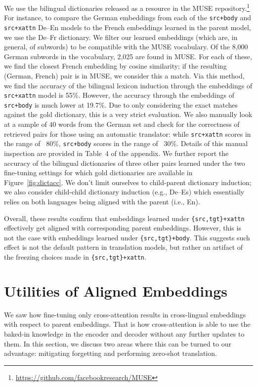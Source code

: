 We use the bilingual dictionaries released as a resource in the MUSE \cite{DBLP:conf/iclr/LampleCRDJ18} repository.\footnote{\url{https://github.com/facebookresearch/MUSE}} For instance, to compare the German embeddings from each of the \texttt{src+body} and \texttt{src+xattn} De--En models to the French embeddings learned in the parent model, we use the De--Fr dictionary. We filter our learned embeddings (which are, in general, of subwords) to be compatible with the MUSE vocabulary. Of the 8,000 German subwords in the vocabulary, 2,025 are found in MUSE. For each of these, we find the closest French embedding by cosine similarity; if the resulting (German, French) pair is in MUSE, we consider this a match. Via this method, we find the accuracy of the bilingual lexicon induction through the embeddings of \texttt{src+xattn} model is 55\%. However, the accuracy through the embeddings of \texttt{src+body} is much lower at 19.7\%. Due to only considering the exact matches against the gold dictionary, this is a very strict evaluation. We also manually look at a sample of 40 words from the German set and check for the correctness of retrieved pairs for those using an automatic translator: while \texttt{src+xattn} scores in the range of ~80\%, \texttt{src+body} scores in the range of ~30\%. Details of this manual inspection are provided in Table~4 of the appendix. We further report the accuracy of the bilingual dictionaries of three other pairs learned under the two fine-tuning settings for which gold dictionaries are available in Figure~\ref{fig:dictacc}. We don't limit ourselves to child-parent dictionary induction; we also consider child-child dictionary induction (e.g., De--Es) which essentially relies on both languages being aligned with the parent (i.e., En).

Overall, these results confirm that embeddings learned under \texttt{\{src,tgt\}+xattn} effectively get aligned with corresponding parent embeddings. However, this is not the case with embeddings learned under \texttt{\{src,tgt\}+body}. This suggests such effect is not the default pattern in translation models, but rather an artifact of the freezing choices made in \texttt{\{src,tgt\}+xattn}.

\section{Utilities of Aligned Embeddings}
\label{sec:disc}

We saw how fine-tuning only cross-attention results in cross-lingual embeddings with respect to parent embeddings. That is how cross-attention is able to use the baked-in knowledge in the encoder and decoder without any further updates to them. In this section, we discuss two areas where this can be turned to our advantage: mitigating forgetting and performing zero-shot translation.

